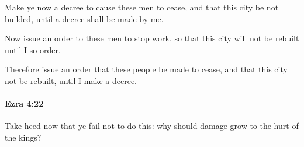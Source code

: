 			\begin{versebox}
					\item[BHS] 
					\item[LXX] 
					\item[ASV] Make ye now a decree to cause these men to cease, and that this city be not builded, until a decree shall be made by me.
					\item[NIV] Now issue an order to these men to stop work, so that this city will not be rebuilt until I so order.
					\item[NRSV] Therefore issue an order that these people be made to cease, and that this city not be rebuilt, until I make a decree.
			\end{versebox}

		\paragraph{Ezra 4:22} %
			\label{EZRA-4-22}

			Take heed now that ye fail not to do this: why should damage grow to the hurt of the kings?

